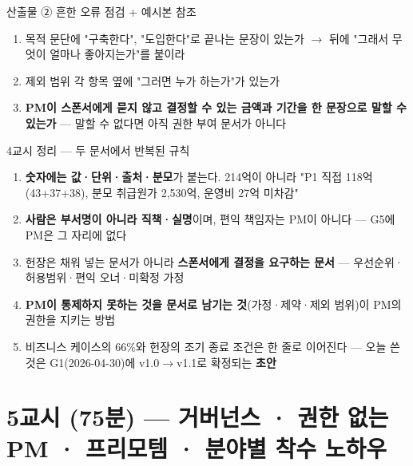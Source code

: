 \begin{frame}[allowframebreaks=1.0]{산출물 ② 흔한 오류 점검 + 예시본 참조}
\begin{enumerate}
\item\relax 목적 문단에 "구축한다", "도입한다"로 끝나는 문장이 있는가 $\rightarrow$ 뒤에 "그래서 무엇이 얼마나 좋아지는가"를 붙이라
\item\relax 제외 범위 각 항목 옆에 "그러면 누가 하는가"가 있는가
\item\relax \textbf{PM이 스폰서에게 묻지 않고 결정할 수 있는 금액과 기간을 한 문장으로 말할 수 있는가} — 말할 수 없다면 아직 권한 부여 문서가 아니다
\end{enumerate}
\end{frame}

\begin{frame}[allowframebreaks=1.0]{4교시 정리 — 두 문서에서 반복된 규칙}
\small
\begin{enumerate}
\item\relax \textbf{숫자에는 값·단위·출처·분모}가 붙는다. 214억이 아니라 "P1 직접 118억(43+37+38), 분모 취급원가 2,530억, 운영비 27억 미차감"
\item\relax \textbf{사람은 부서명이 아니라 직책·실명}이며, 편익 책임자는 PM이 아니다 — G5에 PM은 그 자리에 없다
\item\relax 헌장은 채워 넣는 문서가 아니라 \textbf{스폰서에게 결정을 요구하는 문서} — 우선순위·허용범위·편익 오너·미확정 가정
\item\relax \textbf{PM이 통제하지 못하는 것을 문서로 남기는 것}(가정·제약·제외 범위)이 PM의 권한을 지키는 방법
\item\relax 비즈니스 케이스의 66\%와 헌장의 조기 종료 조건은 한 줄로 이어진다 — 오늘 쓴 것은 G1(2026-04-30)에 v1.0$\rightarrow$v1.1로 확정되는 \textbf{초안}
\end{enumerate}
\end{frame}

\section{5교시 (75분) — 거버넌스 · 권한 없는 PM · 프리모템 · 분야별 착수 노하우}

